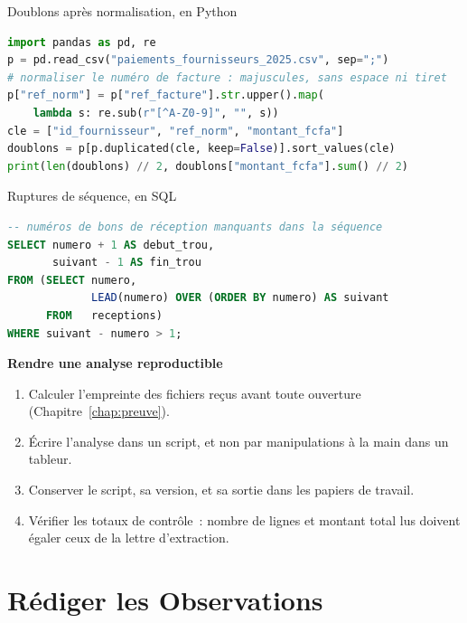\begin{boxoutils}{Doublons après normalisation, en Python}
\begin{lstlisting}[language=Python]
import pandas as pd, re
p = pd.read_csv("paiements_fournisseurs_2025.csv", sep=";")
# normaliser le numéro de facture : majuscules, sans espace ni tiret
p["ref_norm"] = p["ref_facture"].str.upper().map(
    lambda s: re.sub(r"[^A-Z0-9]", "", s))
cle = ["id_fournisseur", "ref_norm", "montant_fcfa"]
doublons = p[p.duplicated(cle, keep=False)].sort_values(cle)
print(len(doublons) // 2, doublons["montant_fcfa"].sum() // 2)
\end{lstlisting}
\end{boxoutils}

\begin{boxoutils}{Ruptures de séquence, en SQL}
\begin{lstlisting}[language=SQL]
-- numéros de bons de réception manquants dans la séquence
SELECT numero + 1 AS debut_trou,
       suivant - 1 AS fin_trou
FROM (SELECT numero,
             LEAD(numero) OVER (ORDER BY numero) AS suivant
      FROM   receptions)
WHERE suivant - numero > 1;
\end{lstlisting}
\end{boxoutils}

\begin{boxprocedure}
\textbf{Rendre une analyse reproductible}
\begin{enumerate}
    \item Calculer l'empreinte des fichiers reçus avant toute ouverture
          (Chapitre~\ref{chap:preuve}).
    \item Écrire l'analyse dans un script, et non par manipulations à la
          main dans un tableur.
    \item Conserver le script, sa version, et sa sortie dans les papiers de
          travail.
    \item Vérifier les totaux de contrôle~: nombre de lignes et montant total
          lus doivent égaler ceux de la lettre d'extraction.
\end{enumerate}
\end{boxprocedure}

\section{Rédiger les Observations}
\label{sec:c18-observations}

